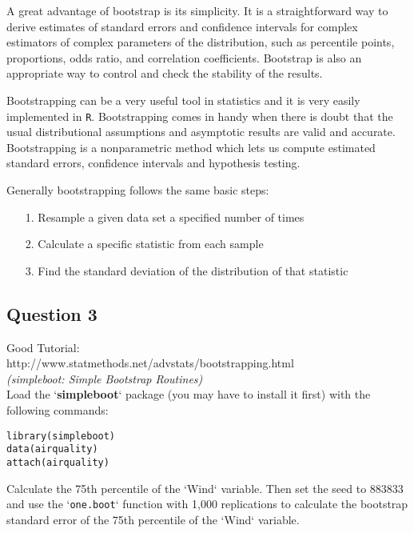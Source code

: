 \documentclass[12pt]{article}
\begin{document}
A great advantage of bootstrap is its simplicity. It is a straightforward way to derive estimates of standard errors and confidence intervals for complex estimators of complex parameters of the distribution, such as percentile points, proportions, odds ratio, and correlation coefficients. Bootstrap is also an appropriate way to control and check the stability of the results.


Bootstrapping can be a very useful tool in statistics and it is very easily implemented in \texttt{R}. Bootstrapping comes in handy when there is doubt that the usual distributional assumptions and asymptotic results are valid and accurate. Bootstrapping is a nonparametric method which lets us compute estimated standard errors, confidence intervals and hypothesis testing.

Generally bootstrapping follows the same basic steps:

\begin{itemize}
\item[1.] Resample a given data set a specified number of times
\item[2.] Calculate a specific statistic from each sample
\item[3.] Find the standard deviation of the distribution of that statistic
\end{itemize}

\newpage
\subsection*{Question 3}
Good Tutorial: \\ http://www.statmethods.net/advstats/bootstrapping.html\\
\textit{(simpleboot: Simple Bootstrap Routines)}\\ 

Load the `\textbf{simpleboot}` package (you may have to install it first) with the
following commands:

\begin{framed}
\begin{verbatim}
library(simpleboot) 
data(airquality)
attach(airquality)
\end{verbatim}
\end{framed}

Calculate the 75th percentile of the `Wind` variable. Then set the seed to
883833 and use the `\texttt{one.boot}` function with 1,000 replications to calculate the
bootstrap standard error of the 75th percentile of the `Wind` variable.
\end{document}
